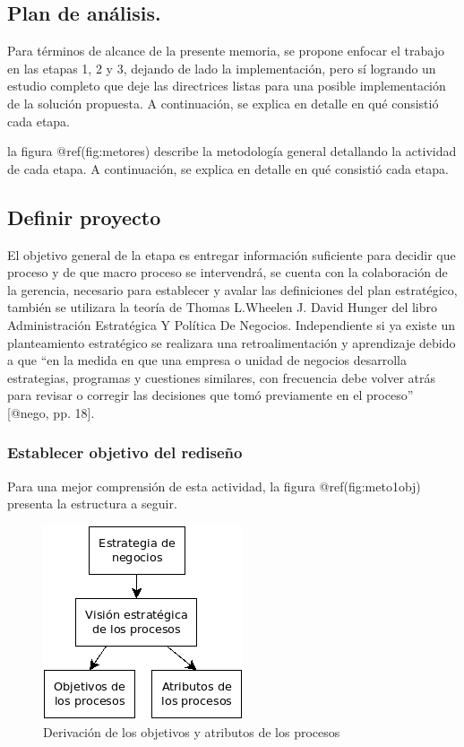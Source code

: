 \documentclass[
]{article}
\begin{document}
\hypertarget{plan-de-anuxe1lisis.}{%
\subsection{Plan de análisis.}\label{plan-de-anuxe1lisis.}}

Para términos de alcance de la presente memoria, se propone enfocar el
trabajo en las etapas 1, 2 y 3, dejando de lado la implementación, pero
sí logrando un estudio completo que deje las directrices listas para una
posible implementación de la solución propuesta. A continuación, se
explica en detalle en qué consistió cada etapa.

la figura @ref(fig:metores) describe la metodología general detallando
la actividad de cada etapa. A continuación, se explica en detalle en qué
consistió cada etapa.

\hypertarget{definir-proyecto}{%
\subsection{Definir proyecto}\label{definir-proyecto}}

El objetivo general de la etapa es entregar información suficiente para
decidir que proceso y de que macro proceso se intervendrá, se cuenta con
la colaboración de la gerencia, necesario para establecer y avalar las
definiciones del plan estratégico, también se utilizara la teoría de
Thomas L.Wheelen J. David Hunger del libro Administración Estratégica Y
Política De Negocios. Independiente si ya existe un planteamiento
estratégico se realizara una retroalimentación y aprendizaje debido a
que ``en la medida en que una empresa o unidad de negocios desarrolla
estrategias, programas y cuestiones similares, con frecuencia debe
volver atrás para revisar o corregir las decisiones que tomó previamente
en el proceso'' {[}@nego, pp. 18{]}.

\hypertarget{establecer-objetivo-del-rediseuxf1o}{%
\subsubsection{Establecer objetivo del
rediseño}\label{establecer-objetivo-del-rediseuxf1o}}

Para una mejor comprensión de esta actividad, la figura
@ref(fig:meto1obj) presenta la estructura a seguir.

\begin{figure}

{\centering \includegraphics[width=0.3\linewidth]{marco teorico/diagramas/METO derivarivacion de objetivos} 

}

\caption{Derivación de los objetivos y atributos de los procesos}\label{fig:unnamed-chunk-8}
\end{figure}
\end{document}
